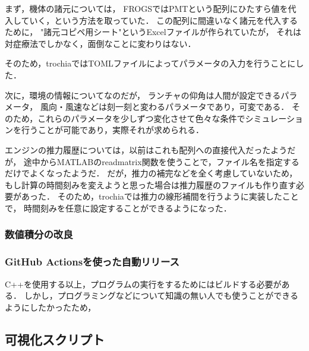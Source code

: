 \documentclass[a4j,10pt]{jsarticle}
\begin{document}
まず，機体の諸元については，
FROGSではPMTという配列にひたすら値を代入していく，という方法を取っていた．
この配列に間違いなく諸元を代入するために，
"諸元コピペ用シート"というExcelファイルが作られていたが，
それは対症療法でしかなく，面倒なことに変わりはない．

そのため，trochiaではTOMLファイルによってパラメータの入力を行うことにした．

次に，環境の情報についてなのだが，
ランチャの仰角は人間が設定できるパラメータ，
風向・風速などは刻一刻と変わるパラメータであり，可変である．
そのため，これらのパラメータを少しずつ変化させて色々な条件でシミュレーションを行うことが可能であり，実際それが求められる．

エンジンの推力履歴については，以前はこれも配列への直接代入だったようだが，
途中からMATLABのreadmatrix関数を使うことで，ファイル名を指定するだけでよくなったようだ．
だが，推力の補完などを全く考慮していないため，
もし計算の時間刻みを変えようと思った場合は推力履歴のファイルも作り直す必要があった．
そのため，trochiaでは推力の線形補間を行うように実装したことで，
時間刻みを任意に設定することができるようになった．

\subsubsection{数値積分の改良}

\subsubsection{GitHub Actionsを使った自動リリース}

C++を使用する以上，プログラムの実行をするためにはビルドする必要がある．
しかし，プログラミングなどについて知識の無い人でも使うことができるようにしたかったため，

\subsection{可視化スクリプト}
\end{document}
